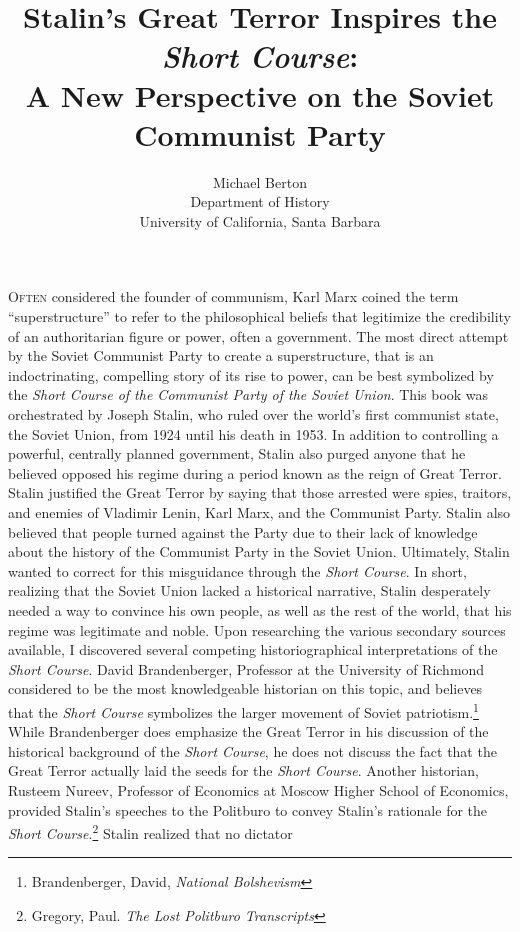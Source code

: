 \documentclass[a4paper, twocolumn]{article}
\date{}
\title{Stalin's Great Terror Inspires the \emph{Short Course}:\\A New Perspective on
   the Soviet Communist Party}
\author{Michael Berton\\ Department of History \\ University of California, Santa Barbara}
\begin{document}
\maketitle

\begingroup
{}


\lettrine[nindent=0cm]{O}{ften} considered the founder of communism,
Karl Marx coined the term ``superstructure''
to refer to the philosophical beliefs that legitimize the
credibility of an authoritarian figure or power, often a
government. The most direct attempt by the Soviet Communist Party to create a
superstructure, that is an indoctrinating, compelling story of its
rise to power, can be best symbolized by the \emph{Short Course of the Communist Party of the Soviet Union}. This book was orchestrated by Joseph Stalin, who ruled over the
world’s first communist state, the Soviet Union, from 1924 until his
death in 1953. In addition to controlling a powerful, centrally
planned government, Stalin also purged anyone that he believed opposed
his regime during a period known as the reign of Great Terror. Stalin
justified the Great Terror by saying that those arrested were spies,
traitors, and enemies of Vladimir Lenin, Karl Marx, and the Communist
Party. Stalin also believed that people turned against the Party due
to their lack of knowledge about the history of the Communist Party in
the Soviet Union. Ultimately, Stalin wanted to correct for this
misguidance through the \emph{Short Course}. In short, realizing that the Soviet Union
lacked a historical narrative, Stalin desperately needed a way to
convince his own people, as well as the rest of the world, that his
regime was legitimate and noble. 
Upon researching the various secondary sources available, I discovered
several competing historiographical interpretations of the \emph{Short
Course}. David Brandenberger, Professor at the University of Richmond
considered to be the most knowledgeable historian on this topic, and
believes that the \emph{Short Course} symbolizes the larger movement of
Soviet patriotism.\footnote{Brandenberger, David, \emph{National Bolshevism}} While Brandenberger does emphasize the Great
Terror in his discussion of the historical background of the \emph{Short
Course}, he does not discuss the fact that the Great Terror actually
laid the seeds for the \emph{Short Course}. Another historian, Rusteem
Nureev, Professor of Economics at Moscow Higher School of Economics,
provided Stalin's speeches to the Politburo to convey Stalin's
rationale for the \emph{Short Course}.\footnote{Gregory, Paul. \emph{The Lost Politburo Transcripts}} Stalin realized that no dictator
\end{document}
